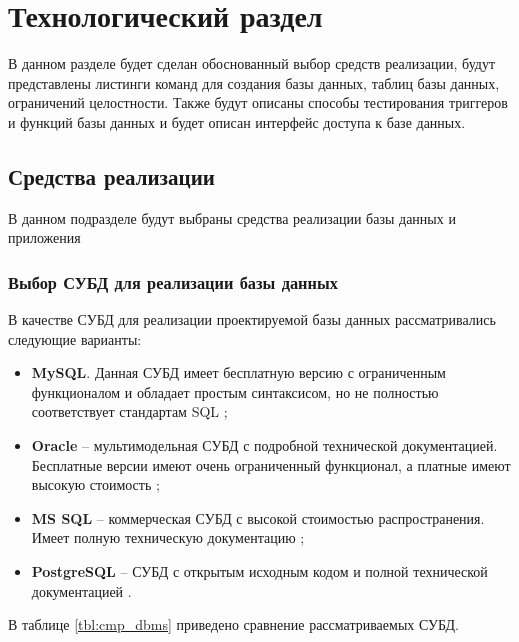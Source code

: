 \chapter{\label{implementation}Технологический раздел}

В данном разделе будет сделан обоснованный выбор средств реализации, будут представлены листинги команд для создания базы данных, таблиц базы данных, ограничений целостности. Также будут описаны способы тестирования триггеров и функций базы данных и будет описан интерфейс доступа к базе данных.

\section{Средства реализации}

В данном подразделе будут выбраны средства реализации базы данных и приложения

\subsection{Выбор СУБД для реализации базы данных}

В качестве СУБД для реализации проектируемой базы данных рассматривались следующие варианты: 

\begin{itemize}
	\item \textbf{MySQL}. Данная СУБД имеет бесплатную версию с ограниченным функционалом и обладает простым синтаксисом, но не полностью соответствует стандартам SQL \cite{info_cmp_dbms};
	\item \textbf{Oracle} -- мультимодельная СУБД с подробной технической документацией. Бесплатные версии имеют очень ограниченный функционал, а платные имеют высокую стоимость \cite{info_cmp_dbms};
	\item \textbf{MS SQL} -- коммерческая СУБД с высокой стоимостью распространения. Имеет полную техническую документацию \cite{info_cmp_dbms};
	\item \textbf{PostgreSQL} -- СУБД с открытым исходным кодом и полной технической документацией \cite{info_cmp_dbms}. 
\end{itemize}

В таблице \ref{tbl:cmp_dbms} приведено сравнение рассматриваемых СУБД.

